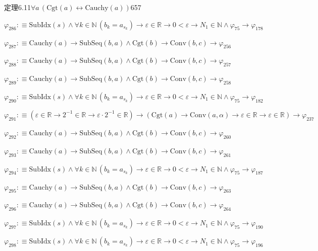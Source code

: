 \begin{fullproof}{定理6.11}{$\forall a\,(\mathrm{Cgt}(a) \leftrightarrow \mathrm{Cauchy}(a))$}{657}
\begin{abbrevlist}
\item $\varphi_{286} :\equiv \mathrm{SubIdx}(s) \land \forall k \in \mathbb{N}\,(b_{k} = a_{s_{k}}) \to \varepsilon \in \mathbb{R} \to 0 < \varepsilon \to N_{1} \in \mathbb{N} \land \varphi_{75} \to \varphi_{178}$
\item $\varphi_{287} :\equiv \mathrm{Cauchy}(a) \to \mathrm{SubSeq}(b,a) \land \mathrm{Cgt}(b) \to \mathrm{Conv}(b,c) \to \varphi_{256}$
\item $\varphi_{288} :\equiv \mathrm{Cauchy}(a) \to \mathrm{SubSeq}(b,a) \land \mathrm{Cgt}(b) \to \mathrm{Conv}(b,c) \to \varphi_{257}$
\item $\varphi_{289} :\equiv \mathrm{Cauchy}(a) \to \mathrm{SubSeq}(b,a) \land \mathrm{Cgt}(b) \to \mathrm{Conv}(b,c) \to \varphi_{258}$
\item $\varphi_{290} :\equiv \mathrm{SubIdx}(s) \land \forall k \in \mathbb{N}\,(b_{k} = a_{s_{k}}) \to \varepsilon \in \mathbb{R} \to 0 < \varepsilon \to N_{1} \in \mathbb{N} \land \varphi_{75} \to \varphi_{182}$
\item $\varphi_{291} :\equiv (\varepsilon \in \mathbb{R} \to 2^{-1} \in \mathbb{R} \to \varepsilon \cdot 2^{-1} \in \mathbb{R}) \to (\mathrm{Cgt}(a) \to \mathrm{Conv}(a,\alpha) \to \varepsilon \in \mathbb{R} \to \varepsilon \in \mathbb{R}) \to \varphi_{237}$
\item $\varphi_{292} :\equiv \mathrm{Cauchy}(a) \to \mathrm{SubSeq}(b,a) \land \mathrm{Cgt}(b) \to \mathrm{Conv}(b,c) \to \varphi_{260}$
\item $\varphi_{293} :\equiv \mathrm{Cauchy}(a) \to \mathrm{SubSeq}(b,a) \land \mathrm{Cgt}(b) \to \mathrm{Conv}(b,c) \to \varphi_{261}$
\item $\varphi_{294} :\equiv \mathrm{SubIdx}(s) \land \forall k \in \mathbb{N}\,(b_{k} = a_{s_{k}}) \to \varepsilon \in \mathbb{R} \to 0 < \varepsilon \to N_{1} \in \mathbb{N} \land \varphi_{75} \to \varphi_{187}$
\item $\varphi_{295} :\equiv \mathrm{Cauchy}(a) \to \mathrm{SubSeq}(b,a) \land \mathrm{Cgt}(b) \to \mathrm{Conv}(b,c) \to \varphi_{263}$
\item $\varphi_{296} :\equiv \mathrm{Cauchy}(a) \to \mathrm{SubSeq}(b,a) \land \mathrm{Cgt}(b) \to \mathrm{Conv}(b,c) \to \varphi_{264}$
\item $\varphi_{297} :\equiv \mathrm{SubIdx}(s) \land \forall k \in \mathbb{N}\,(b_{k} = a_{s_{k}}) \to \varepsilon \in \mathbb{R} \to 0 < \varepsilon \to N_{1} \in \mathbb{N} \land \varphi_{75} \to \varphi_{190}$
\item $\varphi_{298} :\equiv \mathrm{SubIdx}(s) \land \forall k \in \mathbb{N}\,(b_{k} = a_{s_{k}}) \to \varepsilon \in \mathbb{R} \to 0 < \varepsilon \to N_{1} \in \mathbb{N} \land \varphi_{75} \to \varphi_{196}$

\end{abbrevlist}
\end{fullproof}

